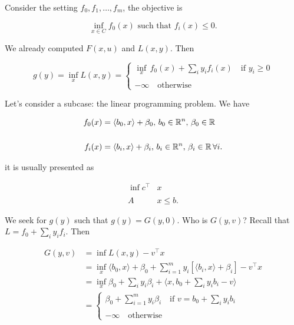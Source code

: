\begin{example}

    Consider the setting $f_0,f_1,\dots,f_m$, the objective is 

    \[ \inf_{x \in C} f_0(x) \text{ such that } f_i(x) \le 0. \]

    We already computed $F(x,u)$ and $L(x,y)$. Then 

    \[ g(y) = \inf_x L(x,y) = 
        \begin{cases}
            \inf_x \,f_0(x) + \sum_i y_i f_i(x) \quad \text{if } y_i \ge 0 \\
            \\
            -\infty \quad \text{otherwise}
        \end{cases}
    \]

    Let's consider a subcase: the linear programming problem. We have 

    \begin{align*}
        f_0(x) &= \langle b_0, x \rangle + \beta_0,\, b_0 \in {\mathbb{R}^n}, \, \beta_0 \in \mathbb{R} \\
        \\
        f_i(x) &= \langle b_i , x \rangle + \beta_i,\, b_i \in {\mathbb{R}^n},\, \beta_i \in \mathbb{R} \, \forall i.
    \end{align*}

    it is usually presented as 

    \begin{align*}
        \inf c^\top& x \\
        \\
        A&x \le b.
    \end{align*}

    We seek for $g(y)$ such that $g(y) = G(y,0)$. Who is $G(y,v)$? Recall that $L = f_0 + \sum_i y_i f_i$. Then 

    \begin{align*}
        G(y,v) &= \inf L(x,y) - v^\top x \\
            &= \inf_x \langle b_0, x \rangle + \beta_0 + \sum_{i=1}^m y_i \left[\langle b_i, x \rangle + \beta_i\right] - v^\top x \\
            &= \inf_x \beta_0 + \sum_i y_i \beta_i + \langle x, b_0 + \sum_i y_i b_i  -v \rangle \\
            &= \begin{cases}
                \beta_0 + \displaystyle\sum_{i=1}^m y_i \beta_i \quad \text{if } v = b_0 + \sum_i y_i b_i \\
                \\
                -\infty \quad \text{otherwise}
            \end{cases}
    \end{align*}


\end{example}
